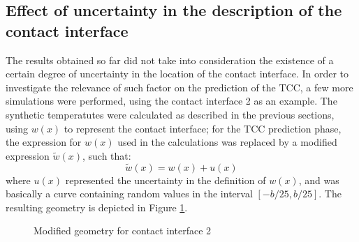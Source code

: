 \documentclass[12pt]{CHT-20}
\begin{document}
\subsection*{Effect of uncertainty in the description of the contact interface} The results obtained so far did not take into consideration the existence of a certain degree of uncertainty in the location of the contact interface. In order to investigate the relevance of such factor on the prediction of the TCC, a few more simulations were performed, using the contact interface 2 as an example. The synthetic temperatutes were calculated as described in the previous sections, using $w(x)$ to represent the contact interface; for the TCC prediction phase, the expression for $w(x)$ used in the calculations was replaced by a modified expression $\tilde{w}(x)$, such that:
\begin{equation}
\tilde{w}(x) = w(x) + u(x)
\end{equation}
where $u(x)$ represented the uncertainty in the definition of $w(x)$, and was basically a curve containing random values in the interval $[-b/25, b/25]$. The resulting geometry is depicted in Figure \ref{fig3b_mod}.
\begin{figure}[H]
	\begin{center}
		\caption{Modified geometry for contact interface 2}
		\label{fig3b_mod}
	\end{center}
\end{figure}
\end{document}
